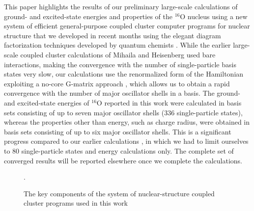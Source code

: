 \documentclass[epj]{svjour}
\begin{document}
This paper highlights the results of our preliminary large-scale
calculations of ground- and excited-state energies and properties
of the $^{16}$O nucleus using a new system of efficient
general-purpose coupled cluster computer programs for nuclear
structure that we developed in recent months using the elegant
diagram factorization techniques developed by quantum chemists
\cite{cpc,creom:open}.
While the earlier large-scale coupled cluster calculations of Mihaila
and Heisenberg \cite{bogdan} used bare interactions,
making the convergence with the number of single-particle basis
states very slow, our calculations use the renormalized form of the Hamiltonian
exploiting a no-core G-matrix approach \cite{dean04}, which allows us to obtain
a rapid convergence with the number of major oscillator shells in a basis.
The ground- and excited-state energies of $^{16}$O reported in this work
were calculated in basis sets consisting of up to seven major oscillator shells
(336 single-particle states), whereas the properties other than energy, such as 
charge radius, were obtained in basis sets consisting
of up to six major oscillator shells. This is a significant progress
compared to our earlier calculations \cite{kowalski04}, in which we had to
limit ourselves to 80 single-particle states and energy calculations only.
The complete set of converged results will be reported
elsewhere once we complete the calculations.
%
\begin{figure}
\hspace*{-7mm}
\vspace*{-7mm}
\caption{
The key components of the system of nuclear-structure coupled cluster programs
used in this work}.
\label{fig:1}       %
\end{figure}
%
\end{document}

